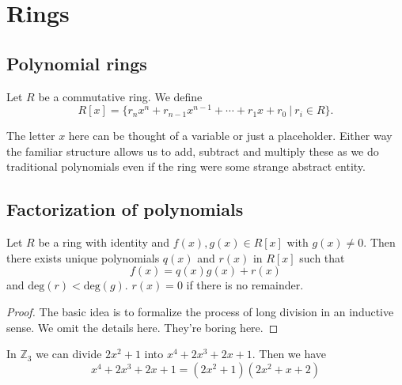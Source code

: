 \chapter{Rings}

\section{Polynomial rings}

\begin{definition}
    Let $R$ be a commutative ring. We define 
    \begin{equation}
        R[x] = \{ r_nx^n + r_{n-1}x^{n-1} + \cdots + r_1 x + r_0 \> | \> r_i \in R \}.
    \end{equation}
\end{definition}

The letter $x$ here can be thought of a variable or just a placeholder. Either way the familiar structure 
allows us to add, subtract and multiply these as we do traditional polynomials even if the ring 
were some strange abstract entity.

\section{Factorization of polynomials}

\begin{theorem}
    Let $R$ be a ring with identity and $f(x),g(x) \in R[x]$ with 
    $g(x) \neq 0$. Then there exists unique polynomials 
    $q(x)$ and $r(x)$ in $R[x]$ such that 
    \begin{equation}
        f(x) = q(x) g(x) + r(x)
    \end{equation}
    and $\text{deg}(r) < \text{deg}(g)$. $r(x) = 0$ if there is no remainder.
\end{theorem}

\begin{proof}
    The basic idea is to formalize the process of long division in an inductive sense. We omit the details here. 
    They're boring here.
\end{proof}

\begin{example}
    In $\mathbb{Z}_3$ we can divide $2x^2 + 1$ into $x^4 + 2x^3 + 2x + 1$. Then we have 
    \[
        x^4 + 2x^3 + 2x + 1 = (2x^2 + 1)(2x^2 + x + 2)
    \]
\end{example}

